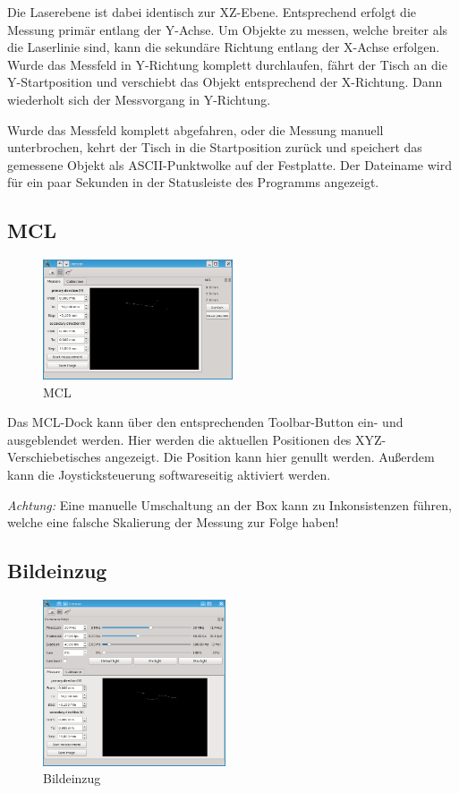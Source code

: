 \documentclass[a4paper,10pt]{scrartcl}
\begin{document}
Die Laserebene ist dabei identisch zur XZ-Ebene. Entsprechend erfolgt die Messung primär entlang
der Y-Achse. Um Objekte zu messen, welche breiter als die Laserlinie sind, kann die sekundäre
Richtung entlang der X-Achse erfolgen. Wurde das Messfeld in Y-Richtung komplett durchlaufen,
fährt der Tisch an die Y-Startposition und verschiebt das Objekt entsprechend der X-Richtung.
Dann wiederholt sich der Messvorgang in Y-Richtung.

Wurde das Messfeld komplett abgefahren, oder die Messung manuell unterbrochen, kehrt der Tisch
in die Startposition zurück und speichert das gemessene Objekt als ASCII-Punktwolke auf der
Festplatte. Der Dateiname wird für ein paar Sekunden in der Statusleiste des Programms angezeigt.

\subsection{MCL}

\begin{figure}[H]
  \centering
  \includegraphics[width=0.5\textwidth]{include/mcl.png}
  \caption{MCL}
  \label{fig:overview}
\end{figure}

Das MCL-Dock kann über den entsprechenden Toolbar-Button ein- und ausgeblendet werden.
Hier werden die aktuellen Positionen des XYZ-Verschiebetisches angezeigt. Die Position kann
hier genullt werden. Außerdem kann die Joysticksteuerung softwareseitig aktiviert werden.

\textsl{Achtung:} Eine manuelle Umschaltung an der Box kann zu Inkonsistenzen führen, welche eine
falsche Skalierung der Messung zur Folge haben!

\subsection{Bildeinzug}

\begin{figure}[H]
  \centering
  \includegraphics[width=0.48\textwidth]{include/cam.png}
  \caption{Bildeinzug}
  \label{fig:overview}
\end{figure}
\end{document}
